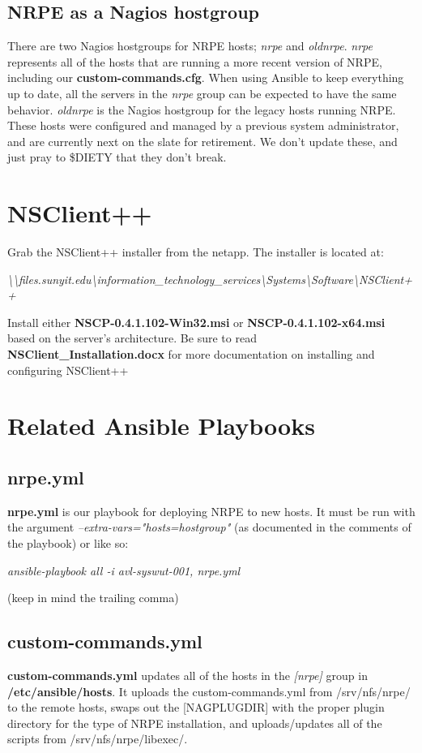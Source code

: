 \documentclass[a4paper]{article}
\begin{document}
\subsection{NRPE as a Nagios hostgroup}
There are two Nagios hostgroups for NRPE hosts; \textit{nrpe} and \textit{oldnrpe}. \textit{nrpe} represents all of the hosts that are running a more recent version of NRPE, including our \textbf{custom-commands.cfg}. When using Ansible to keep everything up to date, all the servers in the \textit{nrpe} group can be expected to have the same behavior. \textit{oldnrpe} is the Nagios hostgroup for the legacy hosts running NRPE. These hosts were configured and managed by a previous system administrator, and are currently next on the slate for retirement. We don't update these, and just pray to \$DIETY that they don't break.

\section{NSClient++}
Grab the NSClient++ installer from the netapp. The installer is located at:
\begin{center}	\textit{\textbackslash{}\textbackslash{}files.sunyit.edu\textbackslash{}information\_technology\_services\textbackslash{}Systems\textbackslash{}Software\textbackslash{}NSClient++}\\
\end{center}

Install either \textbf{NSCP-0.4.1.102-Win32.msi} or \textbf{NSCP-0.4.1.102-x64.msi} based on the server's architecture. Be sure to read \textbf{NSClient\_Installation.docx} for more documentation on installing and configuring NSClient++

\section{Related Ansible Playbooks}
\subsection{nrpe.yml}
\textbf{nrpe.yml} is our playbook for deploying NRPE to new hosts. It must be run with the argument \textit{--extra-vars="hosts=hostgroup"} (as documented in the comments of the playbook) or like so: 
\begin{center}
  \textit{ansible-playbook all -i avl-syswut-001, nrpe.yml}
\end{center}
(keep in mind the trailing comma)
\subsection{custom-commands.yml}
\textbf{custom-commands.yml} updates all of the hosts in the \textit{[nrpe]} group in \textbf{/etc/ansible/hosts}. It uploads the custom-commands.yml from /srv/nfs/nrpe/ to the remote hosts, swaps out the [NAGPLUGDIR] with the proper plugin directory for the type of NRPE installation, and uploads/updates all of the scripts from /srv/nfs/nrpe/libexec/.
\end{document}
